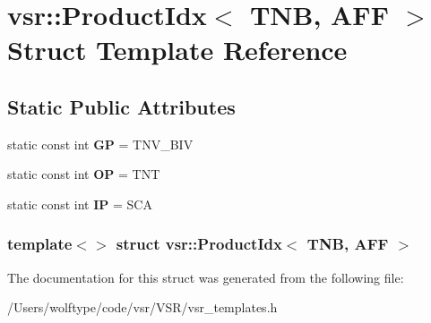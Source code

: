 \hypertarget{structvsr_1_1_product_idx_3_01_t_n_b_00_01_a_f_f_01_4}{\section{vsr\-:\-:Product\-Idx$<$ T\-N\-B, A\-F\-F $>$ Struct Template Reference}
\label{structvsr_1_1_product_idx_3_01_t_n_b_00_01_a_f_f_01_4}
}
\subsection*{Static Public Attributes}
\begin{DoxyCompactItemize}
\item 
\hypertarget{structvsr_1_1_product_idx_3_01_t_n_b_00_01_a_f_f_01_4_a47cdd4f7fc1392891289dfd4c2f311a1}{static const int {\bfseries G\-P} = T\-N\-V\-\_\-\-B\-I\-V}\label{structvsr_1_1_product_idx_3_01_t_n_b_00_01_a_f_f_01_4_a47cdd4f7fc1392891289dfd4c2f311a1}

\item 
\hypertarget{structvsr_1_1_product_idx_3_01_t_n_b_00_01_a_f_f_01_4_a82a5899ae68210a799ac2cc17f5cb453}{static const int {\bfseries O\-P} = T\-N\-T}\label{structvsr_1_1_product_idx_3_01_t_n_b_00_01_a_f_f_01_4_a82a5899ae68210a799ac2cc17f5cb453}

\item 
\hypertarget{structvsr_1_1_product_idx_3_01_t_n_b_00_01_a_f_f_01_4_adf9b95307bda122642537b18c048b7df}{static const int {\bfseries I\-P} = S\-C\-A}\label{structvsr_1_1_product_idx_3_01_t_n_b_00_01_a_f_f_01_4_adf9b95307bda122642537b18c048b7df}

\end{DoxyCompactItemize}
\subsubsection*{template$<$$>$ struct vsr\-::\-Product\-Idx$<$ T\-N\-B, A\-F\-F $>$}



The documentation for this struct was generated from the following file\-:\begin{DoxyCompactItemize}
\item 
/\-Users/wolftype/code/vsr/\-V\-S\-R/vsr\-\_\-templates.\-h\end{DoxyCompactItemize}
